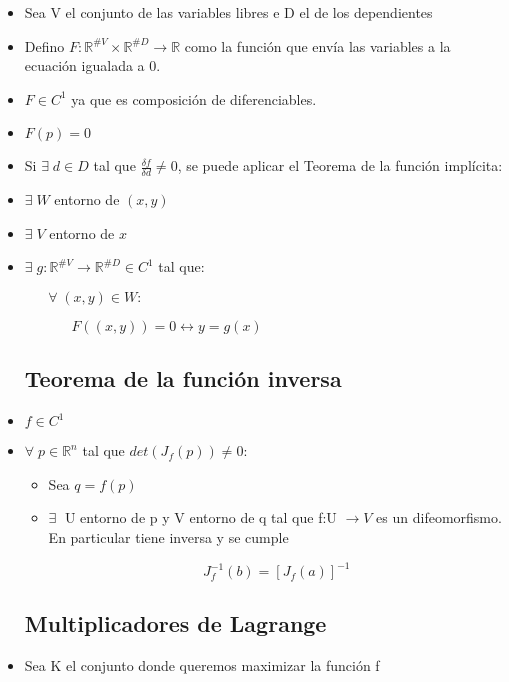 \documentclass[twoside]{article}
\newcommand{\R}{\mathbb{R}}
\newcommand{\s}{\hspace{20pt}}
\newcommand{\all}{\forall \;}
\newcommand{\ex}{\exists \;}
\begin{document}
\begin{itemize}

\item Sea V el conjunto de las variables libres e D el de los dependientes

\item Defino $F: \R^{\#V} \times \R^{\#D} \rightarrow \R$ como la función que envía las variables a la ecuación igualada a 0.

\item $F \in C^1$ ya que es composición de diferenciables.

\item $F(p) = 0$

\item Si $\ex d \in D$ tal que $ \frac{\delta f}{\delta d} \neq 0$, se puede aplicar el Teorema de la función implícita:

\item $\ex W$ entorno de $(x,y)$
\item $\ex V$ entorno de $x$
\item $\ex g: \R^{\#V} \rightarrow \R^{\#D} \in C^1$ tal que:

$\s \all (x,y) \in W:$

$\s \s F((x,y)) = 0 \leftrightarrow y = g(x)$

\subsection{Teorema de la función inversa}

\item $f \in C^1$

\item $\all p \in \R^n $ tal que $det(J_f(p)) \neq 0:$

\begin{itemize}
\item Sea $q = f(p)$

\item $\ex $ U entorno de p y V entorno de q tal que f:U $\rightarrow V$ es un difeomorfismo. En particular tiene inversa y se cumple

$$J_f^{-1}(b) = [J_f(a)]^{-1}$$
\end{itemize}

\subsection{Multiplicadores de Lagrange}

\item Sea K el conjunto donde queremos maximizar la función f


\end{itemize}
\end{document}
